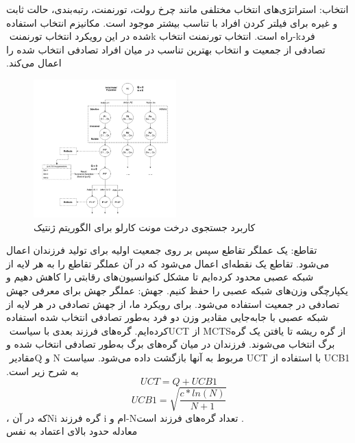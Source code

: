 \documentclass[11pt]{article}
\begin{document}
\begin{multicols}{2}
		انتخاب: استراتژی‌های انتخاب مختلفی مانند چرخ رولت، تورنمنت، ‏رتبه‌بندی، حالت ثابت و غیره برای فیلتر کردن افراد با تناسب بیشتر ‏موجود است. مکانیزم انتخاب استفاده شده در این رویکرد انتخاب ‏تورنمنت ‏k‏-راه است. انتخاب تورنمنت انتخاب ‏k‏ فرد تصادفی از جمعیت ‏و انتخاب بهترین تناسب در میان افراد تصادفی انتخاب شده را اعمال ‏می‌کند.‏
		\begin{figure}[H]
			\centering
			\includegraphics[width=0.49\textwidth,keepaspectratio]{5.png}
			\caption{کاربرد جستجوی درخت مونت کارلو برای الگوریتم ژنتیک}
			\label{fig:fig5}
		\end{figure}
		تقاطع: یک عملگر تقاطع سپس بر روی جمعیت اولیه برای تولید ‏فرزندان اعمال می‌شود. تقاطع یک نقطه‌ای اعمال می‌شود که در آن ‏عملگر تقاطع را به هر لایه از شبکه عصبی محدود کرده‌ایم تا مشکل ‏کنوانسیون‌های رقابتی را کاهش دهیم و یکپارچگی وزن‌های شبکه ‏عصبی را حفظ کنیم.‏
		جهش: عملگر جهش برای معرفی جهش تصادفی در جمعیت ‏استفاده می‌شود. برای رویکرد ما، از جهش تصادفی در هر لایه از شبکه ‏عصبی با جابه‌جایی مقادیر وزن دو فرد به‌طور تصادفی انتخاب شده ‏استفاده کرده‌ایم. گره‌های فرزند بعدی با سیاست ‏UCT‏ از ‏MCTS‏ از ‏گره ریشه تا یافتن یک گره برگ انتخاب می‌شوند. فرزندان در میان ‏گره‌های برگ به‌طور تصادفی انتخاب شده و مقادیر ‏Q‏ و ‏N‏ مربوط به ‏آنها بازگشت داده می‌شود. سیاست ‏UCT‏ با استفاده از ‏UCB1‎‏ به شرح ‏زیر است.‏
		\[ UCT=Q+UCB1 \]
		\[UCB1=\sqrt{\dfrac{c*ln(N)}{N+1}} \]،که در آن ‏Ni‏ گره فرزند ‏i‏-ام و ‏N‏ تعداد گره‌های فرزند است.
		\\معادله حدود بالای اعتماد به نفس
		

\end{multicols}
\end{document}
